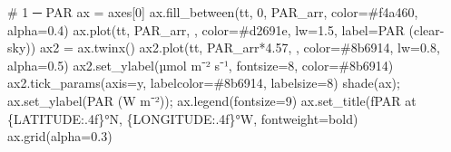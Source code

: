 \documentclass[
  letterpaper,
  DIV=11,
  numbers=noendperiod]{scrartcl}
\newenvironment{Shaded}{\begin{snugshade}}{\end{snugshade}}
\newcommand{\CommentTok}[1]{\textcolor[rgb]{0.37,0.37,0.37}{#1}}
\newcommand{\DecValTok}[1]{\textcolor[rgb]{0.68,0.00,0.00}{#1}}
\newcommand{\FloatTok}[1]{\textcolor[rgb]{0.68,0.00,0.00}{#1}}
\newcommand{\NormalTok}[1]{\textcolor[rgb]{0.00,0.23,0.31}{#1}}
\newcommand{\OperatorTok}[1]{\textcolor[rgb]{0.37,0.37,0.37}{#1}}
\newcommand{\SpecialCharTok}[1]{\textcolor[rgb]{0.37,0.37,0.37}{#1}}
\newcommand{\SpecialStringTok}[1]{\textcolor[rgb]{0.13,0.47,0.30}{#1}}
\newcommand{\StringTok}[1]{\textcolor[rgb]{0.13,0.47,0.30}{#1}}
\begin{document}
\begin{Shaded}
\begin{Highlighting}[]
\CommentTok{\# 1 ─ PAR}
\NormalTok{ax }\OperatorTok{=}\NormalTok{ axes[}\DecValTok{0}\NormalTok{]}
\NormalTok{ax.fill\_between(tt, }\DecValTok{0}\NormalTok{, PAR\_arr, color}\OperatorTok{=}\StringTok{\textquotesingle{}\#f4a460\textquotesingle{}}\NormalTok{, alpha}\OperatorTok{=}\FloatTok{0.4}\NormalTok{)}
\NormalTok{ax.plot(tt, PAR\_arr, }\StringTok{\textquotesingle{}{-}\textquotesingle{}}\NormalTok{, color}\OperatorTok{=}\StringTok{\textquotesingle{}\#d2691e\textquotesingle{}}\NormalTok{, lw}\OperatorTok{=}\FloatTok{1.5}\NormalTok{, label}\OperatorTok{=}\StringTok{\textquotesingle{}PAR (clear{-}sky)\textquotesingle{}}\NormalTok{)}
\NormalTok{ax2 }\OperatorTok{=}\NormalTok{ ax.twinx()}
\NormalTok{ax2.plot(tt, PAR\_arr}\OperatorTok{*}\FloatTok{4.57}\NormalTok{, }\StringTok{\textquotesingle{}{-}{-}\textquotesingle{}}\NormalTok{, color}\OperatorTok{=}\StringTok{\textquotesingle{}\#8b6914\textquotesingle{}}\NormalTok{, lw}\OperatorTok{=}\FloatTok{0.8}\NormalTok{, alpha}\OperatorTok{=}\FloatTok{0.5}\NormalTok{)}
\NormalTok{ax2.set\_ylabel(}\StringTok{\textquotesingle{}µmol m⁻² s⁻¹\textquotesingle{}}\NormalTok{, fontsize}\OperatorTok{=}\DecValTok{8}\NormalTok{, color}\OperatorTok{=}\StringTok{\textquotesingle{}\#8b6914\textquotesingle{}}\NormalTok{)}
\NormalTok{ax2.tick\_params(axis}\OperatorTok{=}\StringTok{\textquotesingle{}y\textquotesingle{}}\NormalTok{, labelcolor}\OperatorTok{=}\StringTok{\textquotesingle{}\#8b6914\textquotesingle{}}\NormalTok{, labelsize}\OperatorTok{=}\DecValTok{8}\NormalTok{)}
\NormalTok{shade(ax)}\OperatorTok{;}\NormalTok{ ax.set\_ylabel(}\StringTok{\textquotesingle{}PAR (W m⁻²)\textquotesingle{}}\NormalTok{)}\OperatorTok{;}\NormalTok{ ax.legend(fontsize}\OperatorTok{=}\DecValTok{9}\NormalTok{)}
\NormalTok{ax.set\_title(}\SpecialStringTok{f\textquotesingle{}PAR at }\SpecialCharTok{\{}\NormalTok{LATITUDE}\SpecialCharTok{:.4f\}}\SpecialStringTok{°N, }\SpecialCharTok{\{}\NormalTok{LONGITUDE}\SpecialCharTok{:.4f\}}\SpecialStringTok{°W\textquotesingle{}}\NormalTok{, fontweight}\OperatorTok{=}\StringTok{\textquotesingle{}bold\textquotesingle{}}\NormalTok{)}
\NormalTok{ax.grid(alpha}\OperatorTok{=}\FloatTok{0.3}\NormalTok{)}


\end{Highlighting}
\end{Shaded}
\end{document}

